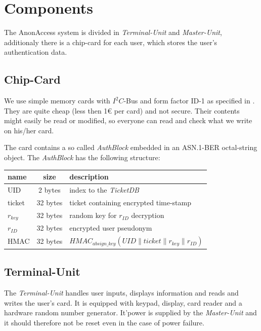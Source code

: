 \section{Components}
The AnonAccess system is divided in \textit{Terminal-Unit} and \textit{Master-Unit}, additionaly there is a chip-card for each user, which stores the user's authentication data.


\subsection{Chip-Card}
We use simple memory cards with $I^2C$-Bus\cite{I2C} and form factor ID-1 as specified in \cite{ISO7816-1}\cite{ISO7816-2}. They are quite cheap (less then 1\euro{} per card) and not secure. Their contents might easily be read or modified, so everyone can read and check what we write on his/her card.

The card contains a so called \textit{AuthBlock} embedded in an ASN.1-BER\cite{ASN.1BER} octal-string object.
The \textit{AuthBlock} has the following structure:\\
\begin{tabular}{|l|c|l|} \hline
name       & size     & description \\ \hline 
UID        & 2 bytes  & index to the \textit{TicketDB} \\
ticket     & 32 bytes & ticket containing encrypted time-stamp \\
$r_{key}$  & 32 bytes & random key for $r_{ID}$ decryption \\
$r_{ID}$   & 32 bytes & encrypted user pseudonym \\
HMAC       & 32 bytes & $HMAC_{absign\_key}(UID \parallel ticket \parallel r_{key} \parallel r_{ID})$\\ \hline
\end{tabular} 

\subsection{Terminal-Unit}
The \textit{Terminal-Unit} handles user inputs, displays information and reads and writes the user's card.
It is equipped with keypad, display, card reader and a hardware random number generator. It'power is supplied by the \textit{Master-Unit} and it should therefore not be reset even in the case of power failure.

